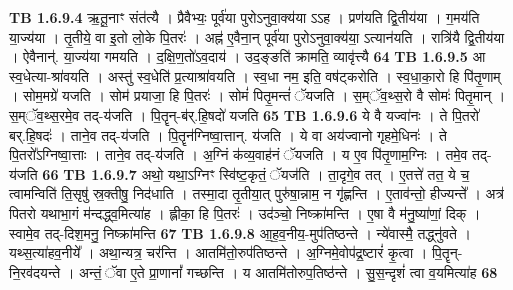 \documentclass[17pt]{extarticle}
\begin{document}
                                \textbf{ TB 1.6.9.4} \newline
                  ऋ॒तू॒नाꣳ संत॑त्यै । प्रैवैभ्यः॒ पूर्व॑या पुरोऽनुवा॒क्य॑या ऽऽह । प्रण॑यति द्वि॒तीय॑या । ग॒मय॑ति या॒ज्य॑या । तृ॒तीये॒ वा इ॒तो लो॒के पि॒तरः॑ । अह्न॑ ए॒वैना॒न् पूर्व॑या पुरोऽनुवा॒क्य॑या॒ ऽत्यान॑यति । रात्रि॑यै द्वि॒तीय॑या । ऐवैनान्॑. या॒ज्य॑या गमयति । द॒क्षि॒ण॒तो॑ऽव॒दाय॑ । उद॒ङ्ङति॑ क्रामति॒ व्यावृ॑त्त्यै \textbf{ 64} \newline
                  \newline
                                \textbf{ TB 1.6.9.5} \newline
                  आ स्व॒धेत्या-श्रा॑वयति । अस्तु॑ स्व॒धेति॑ प्र॒त्याश्रा॑वयति । स्व॒धा नम॒ इति॒ वष॑ट्करोति । स्व॒धा॒का॒रो हि पि॑तृ॒णाम् । सोम॒मग्रे॑ यजति । सोम॑ प्रयाजा॒ हि पि॒तरः॑ । सोमं॑ पितृ॒मन्तं॑ ॅयजति । स॒म्ॅव॒थ्स॒रो वै सोमः॑ पितृ॒मान् । स॒म्ॅव॒थ्स॒रमे॒व तद्-य॑जति । पि॒तॄन्-ब॑र्.हि॒षदो॑ यजति \textbf{ 65} \newline
                  \newline
                                \textbf{ TB 1.6.9.6} \newline
                  ये वै यज्वा॑नः । ते पि॒तरो॑ बर्.हि॒षदः॑ । ताने॒व तद्-य॑जति । पि॒तॄन॑ग्निष्वा॒त्तान्. य॑जति । ये वा अय॑ज्वानो गृहमे॒धिनः॑ । ते पि॒तरो᳚ऽग्निष्वा॒त्ताः । ताने॒व तद्-य॑जति । अ॒ग्निं क॑व्य॒वाह॑नं ॅयजति । य ए॒व पि॑तृ॒णाम॒ग्निः । तमे॒व तद्-य॑जति \textbf{ 66} \newline
                  \newline
                                \textbf{ TB 1.6.9.7} \newline
                  अथो॒ यथा॒ऽग्निꣳ स्वि॑ष्ट॒कृतं॒ ॅयज॑ति । ता॒दृगे॒व तत् । ए॒तत्ते॑ तत॒ ये च॒ त्वामन्विति॑ ति॒सृषु॑ स्र॒क्तीषु॒ निद॑धाति । तस्मा॒दा तृ॒तीया॒त् पुरु॑षा॒न्नाम॒ न गृ॑ह्णन्ति । ए॒ताव॑न्तो॒ हीज्यन्ते᳚ । अत्र॑ पितरो यथाभा॒गं म॑न्दद्ध्व॒मित्या॑ह । ह्लीका॒ हि पि॒तरः॑ । उद॑ञ्चो॒ निष्क्रा॑मन्ति । ए॒षा वै म॑नु॒ष्या॑णां॒ दिक् । स्वामे॒व तद्-दिश॒मनु॒ निष्क्रा॑मन्ति \textbf{ 67} \newline
                  \newline
                                \textbf{ TB 1.6.9.8} \newline
                  आ॒ह॒व॒नीय॒-मुप॑तिष्ठन्ते । न्ये॑वास्मै॒ तद्ध्नु॑वते । यथ्स॒त्या॑हव॒नीये᳚ । अथा॒न्यत्र॒ चर॑न्ति । आतमि॑तो॒रुप॑तिष्ठन्ते । अ॒ग्निमे॒वोप॑द्र॒ष्टारं॑ कृ॒त्वा । पि॒तॄन्-नि॒रव॑दयन्ते । अन्तं॒ ॅवा ए॒ते प्रा॒णानां᳚ गच्छन्ति । य आतमि॑तोरुप॒तिष्ठ॑न्ते । सु॒स॒न्दृशं॑ त्वा व॒यमित्या॑ह \textbf{ 68} \newline
\end{document}
